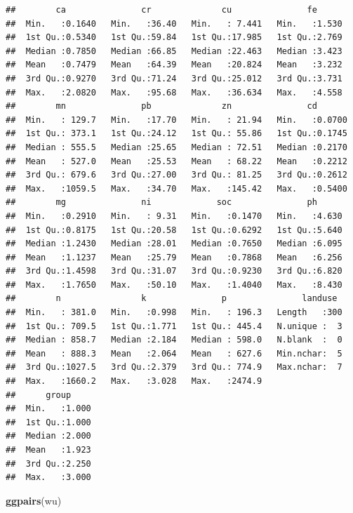 \documentclass[
]{article}
\newenvironment{Shaded}{\begin{snugshade}}{\end{snugshade}}
\newcommand{\FunctionTok}[1]{\textcolor[rgb]{0.13,0.29,0.53}{\textbf{#1}}}
\newcommand{\NormalTok}[1]{#1}
\begin{document}
\begin{verbatim}
##        ca               cr              cu               fe       
##  Min.   :0.1640   Min.   :36.40   Min.   : 7.441   Min.   :1.530  
##  1st Qu.:0.5340   1st Qu.:59.84   1st Qu.:17.985   1st Qu.:2.769  
##  Median :0.7850   Median :66.85   Median :22.463   Median :3.423  
##  Mean   :0.7479   Mean   :64.39   Mean   :20.824   Mean   :3.232  
##  3rd Qu.:0.9270   3rd Qu.:71.24   3rd Qu.:25.012   3rd Qu.:3.731  
##  Max.   :2.0820   Max.   :95.68   Max.   :36.634   Max.   :4.558  
##        mn               pb              zn               cd        
##  Min.   : 129.7   Min.   :17.70   Min.   : 21.94   Min.   :0.0700  
##  1st Qu.: 373.1   1st Qu.:24.12   1st Qu.: 55.86   1st Qu.:0.1745  
##  Median : 555.5   Median :25.65   Median : 72.51   Median :0.2170  
##  Mean   : 527.0   Mean   :25.53   Mean   : 68.22   Mean   :0.2212  
##  3rd Qu.: 679.6   3rd Qu.:27.00   3rd Qu.: 81.25   3rd Qu.:0.2612  
##  Max.   :1059.5   Max.   :34.70   Max.   :145.42   Max.   :0.5400  
##        mg               ni             soc               ph       
##  Min.   :0.2910   Min.   : 9.31   Min.   :0.1470   Min.   :4.630  
##  1st Qu.:0.8175   1st Qu.:20.58   1st Qu.:0.6292   1st Qu.:5.640  
##  Median :1.2430   Median :28.01   Median :0.7650   Median :6.095  
##  Mean   :1.1237   Mean   :25.79   Mean   :0.7868   Mean   :6.256  
##  3rd Qu.:1.4598   3rd Qu.:31.07   3rd Qu.:0.9230   3rd Qu.:6.820  
##  Max.   :1.7650   Max.   :50.10   Max.   :1.4040   Max.   :8.430  
##        n                k               p               landuse   
##  Min.   : 381.0   Min.   :0.998   Min.   : 196.3   Length   :300  
##  1st Qu.: 709.5   1st Qu.:1.771   1st Qu.: 445.4   N.unique :  3  
##  Median : 858.7   Median :2.184   Median : 598.0   N.blank  :  0  
##  Mean   : 888.3   Mean   :2.064   Mean   : 627.6   Min.nchar:  5  
##  3rd Qu.:1027.5   3rd Qu.:2.379   3rd Qu.: 774.9   Max.nchar:  7  
##  Max.   :1660.2   Max.   :3.028   Max.   :2474.9                  
##      group      
##  Min.   :1.000  
##  1st Qu.:1.000  
##  Median :2.000  
##  Mean   :1.923  
##  3rd Qu.:2.250  
##  Max.   :3.000
\end{verbatim}

\begin{Shaded}
\begin{Highlighting}[]
\FunctionTok{ggpairs}\NormalTok{(wu)}
\end{Highlighting}
\end{Shaded}
\end{document}

